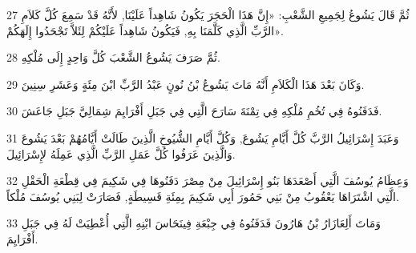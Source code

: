 \par 27 ثُمَّ قَالَ يَشُوعُ لِجَمِيعِ الشَّعْبِ: «إِنَّ هَذَا الْحَجَرَ يَكُونُ شَاهِداً عَلَيْنَا, لأَنَّهُ قَدْ سَمِعَ كُلَّ كَلاَمِ الرَّبِّ الَّذِي كَلَّمَنَا بِهِ, فَيَكُونُ شَاهِداً عَلَيْكُمْ لِئَلاَّ تَجْحَدُوا إِلَهَكُمْ».
\par 28 ثُمَّ صَرَفَ يَشُوعُ الشَّعْبَ كُلَّ وَاحِدٍ إِلَى مُلْكِهِ.
\par 29 وَكَانَ بَعْدَ هَذَا الْكَلاَمِ أَنَّهُ مَاتَ يَشُوعُ بْنُ نُونٍ عَبْدُ الرَّبِّ ابْنَ مِئَةٍ وَعَشَرِ سِنِينَ.
\par 30 فَدَفَنُوهُ فِي تُخُمِ مُلْكِهِ فِي تِمْنَةَ سَارَحَ الَّتِي فِي جَبَلِ أَفْرَايِمَ شِمَالِيَّ جَبَلِ جَاعَشَ.
\par 31 وَعَبَدَ إِسْرَائِيلُ الرَّبَّ كُلَّ أَيَّامِ يَشُوعَ, وَكُلَّ أَيَّامِ الشُّيُوخِ الَّذِينَ طَالَتْ أَيَّامُهُمْ بَعْدَ يَشُوعَ وَالَّذِينَ عَرَفُوا كُلَّ عَمَلِ الرَّبِّ الَّذِي عَمِلَهُ لإِسْرَائِيلَ.
\par 32 وَعِظَامُ يُوسُفَ الَّتِي أَصْعَدَهَا بَنُو إِسْرَائِيلَ مِنْ مِصْرَ دَفَنُوهَا فِي شَكِيمَ فِي قِطْعَةِ الْحَقْلِ الَّتِي اشْتَرَاهَا يَعْقُوبُ مِنْ بَنِي حَمُورَ أَبِي شَكِيمَ بِمِئَةِ قَسِيطَةٍ, فَصَارَتْ لِبَنِي يُوسُفَ مُلْكاً.
\par 33 وَمَاتَ أَلِعَازَارُ بْنُ هَارُونَ فَدَفَنُوهُ فِي جِبْعَةِ فِينَحَاسَ ابْنِهِ الَّتِي أُعْطِيَتْ لَهُ فِي جَبَلِ أَفْرَايِمَ.



